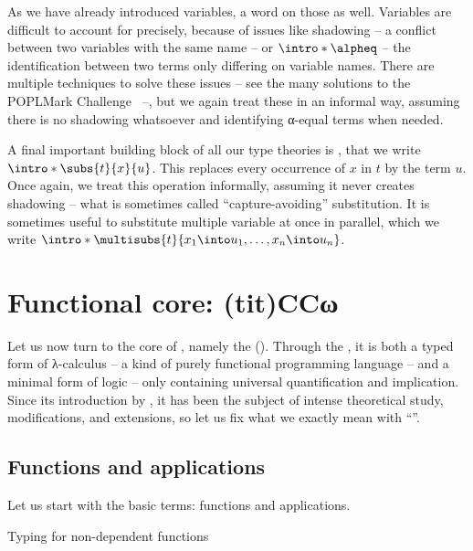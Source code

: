 \AP As we have already introduced variables, a word on those as well. Variables are difficult
to account for precisely, because of issues like shadowing – a conflict between two variables
with the same name – or  $\intro*\alpheq$ – the identification between two terms
only differing on variable names. There are multiple techniques to solve these issues
– see the many solutions to the POPLMark Challenge~ –, 
but we again treat these in an informal way, assuming
there is no shadowing whatsoever and identifying α-equal terms when needed.%

\AP {}
A final important building block of all our type theories is ,
that we write $\intro*\subs{t}{x}{u}$. This replaces every occurrence of $x$ in $t$ by the term
$u$. Once again, we treat this operation informally, assuming it never creates
shadowing – what is sometimes called “capture-avoiding” substitution.
It is sometimes useful to substitute multiple variable at once in parallel,
which we write $\intro*\multisubs{t}{x_1 \into u_1, \dots, x_n \into u_n}$.

\section{Functional core: \kl(tit){CCω}}
\label{sec:tech-ccw}

\AP Let us now turn to the core of , namely the
 (). Through the ,
it is both a typed form of λ-calculus – \ie a kind of purely functional
programming language – and a minimal form
of logic – only containing universal quantification and implication.
Since its introduction by , it has been the subject of intense
theoretical study, modifications, and extensions, so let us fix what we exactly mean
with “”.

\subsection{Functions and applications}

Let us start with the basic terms: functions and applications.

\begin{marginfigure}
  \ContinuedFloat
  \caption{Typing for non-dependent functions}
  \label{fig:cic-nondep-fun}
\end{marginfigure}

